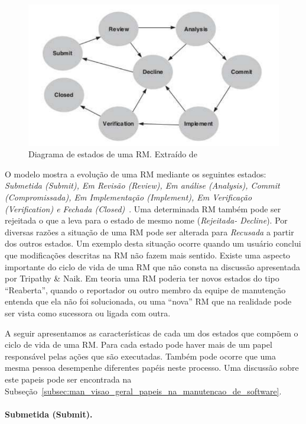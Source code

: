 \begin{figure}[htpb]
	\centering
	\includegraphics[width=0.8\linewidth]{./chapter-manutencao-software-visao-geral/img/diagrama-estado-rm.pdf}
	\caption{Diagrama de estados de uma RM\@. Extraído
		de~\cite{tripathy2014software}}
\label{fig:diagrama-estado-rm}
\end{figure}

O modelo mostra a evolução de uma RM mediante os seguintes estados:
\textit{Submetida (Submit), Em Revisão (Review), Em análise (Analysis), Commit
	(Compromissada), Em Implementação (Implement), Em Verificação (Verification)
	e Fechada (Closed)}~\cite{tripathy2014software}. Uma determinada RM também
pode ser rejeitada o que a leva para o estado de mesmo nome
(\textit{Rejeitada\@-\@
	Decline}).  Por diversas razões a situação de uma RM pode ser alterada para
\textit{Recusada} a partir dos outros estados. Um exemplo desta situação ocorre
quando um  usuário conclui que modificações descritas na RM não fazem mais
sentido. Existe uma aspecto importante do ciclo de vida de uma RM que não consta
na discussão apresentada por Tripathy \& Naik. Em teoria uma RM poderia ter
novos estados do tipo ``Reaberta'', quando o reportador ou outro membro da
equipe de manutenção entenda que ela não foi solucionada, ou uma ``nova'' RM que
na realidade pode ser vista como sucessora ou ligada com outra.

A seguir apresentamos as características de cada um dos estados que compõem o
ciclo de vida de uma RM\@. Para cada estado pode haver mais de um papel
responsável pelas ações que são executadas. Também pode ocorre que uma mesma
pessoa desempenhe diferentes papéis neste processo. Uma discussão sobre este
papeis pode ser encontrada na
Subseção~\ref{subsec:man_visao_geral_papeis_na_manutencao_de_software}.

\paragraph{Submetida (Submit).}
\label{par:submetida)}

